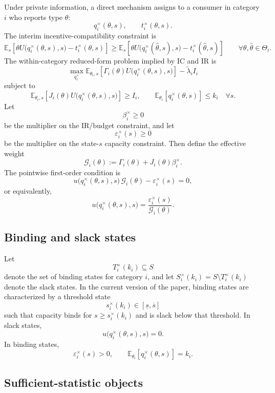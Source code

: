 \documentclass[master.tex]{subfiles}
\begin{document}
Under private information, a direct mechanism assigns to a consumer in category $i$ who reports type $\theta$:
\[
q_i^{\times}(\theta,s), \qquad t_i^{\times}(\theta,s).
\]
The interim incentive-compatibility constraint is
\[
\mathbb E_s\!\left[\theta U\bigl(q_i^{\times}(\theta,s),s\bigr)-t_i^{\times}(\theta,s)\right] \ge \mathbb E_s\!\left[\theta U\bigl(q_i^{\times}(\hat \theta,s),s\bigr)-t_i^{\times}(\hat \theta,s)\right] \qquad \forall \theta,\hat \theta \in \Theta_i.
\]
The within-category reduced-form problem implied by IC and IR is
\[
\max_{q_i^{\times}} \mathbb E_{\theta_i,s}\!\left[\Gamma_i(\theta) U\bigl(q_i^{\times}(\theta,s),s\bigr)\right] - \tilde \lambda_i I_i
\]
subject to
\[
\mathbb E_{\theta_i,s}\!\left[J_i(\theta)U\bigl(q_i^{\times}(\theta,s),s\bigr)\right] \ge I_i, \qquad \mathbb E_{\theta_i}\!\left[q_i^{\times}(\theta,s)\right] \le k_i \quad \forall s.
\]
Let
\[
\beta_i^{\times} \ge 0
\]
be the multiplier on the IR/budget constraint, and let
\[
\varepsilon_i^{\times}(s) \ge 0
\]
be the multiplier on the state-$s$ capacity constraint. Then define the effective weight
\[
\mathcal G_i(\theta) := \Gamma_i(\theta) + J_i(\theta)\beta_i^{\times}.
\]
The pointwise first-order condition is
\[
u\bigl(q_i^{\times}(\theta,s),s\bigr)\, \mathcal G_i(\theta) - \varepsilon_i^{\times}(s)=0,
\]
or equivalently,
\[
u\bigl(q_i^{\times}(\theta,s),s\bigr) = \frac{\varepsilon_i^{\times}(s)}{\mathcal G_i(\theta)}.
\]

\subsection{Binding and slack states}

Let
\[
T_i^{\times}(k_i) \subseteq S
\]
denote the set of binding states for category $i$, and let $S_i^{\times}(k_i)=S\setminus T_i^{\times}(k_i)$ denote the slack states. In the current version of the paper, binding states are characterized by a threshold state
\[
s_i^{\times}(k_i) \in [\underline s,\overline s]
\]
such that capacity binds for $s \ge s_i^{\times}(k_i)$ and is slack below that threshold. In slack states,
\[
u\bigl(q_i^{\times}(\theta,s),s\bigr)=0.
\]
In binding states,
\[
\varepsilon_i^{\times}(s)>0, \qquad \mathbb E_{\theta_i}[q_i^{\times}(\theta,s)] = k_i.
\]

\subsection{Sufficient-statistic objects}
\end{document}

